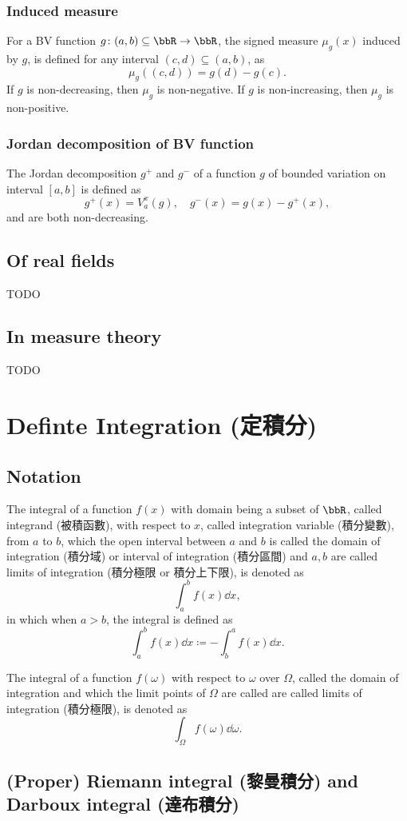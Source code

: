\documentclass[a4paper,12pt]{report}
\begin{document}
\begin{itemize}
\begin{itemize}
\subsubsection{Induced measure}
For a BV function $g\colon(a,b)\subseteq\bbR\to\bbR$, the signed measure $\mu_g(x)$ induced by $g$, is defined for any interval $(c,d)\subseteq (a,b)$, as
\[\mu_g((c,d))=g(d)-g(c).\]
If $g$ is non-decreasing, then $\mu_g$ is non-negative. If $g$ is non-increasing, then $\mu_g$ is non-positive.
\subsubsection{Jordan decomposition of BV function}
The Jordan decomposition $g^+$ and $g^-$ of a function $g$ of bounded variation on interval $[a,b]$ is defined as
\[g^+(x)=V_a^x(g),\quad g^-(x)=g(x)-g^+(x),\]
and are both non-decreasing.
\subsection{Of real fields}
TODO
\subsection{In measure theory}
TODO



\section{Definte Integration (定積分)}
\subsection{Notation}
The integral of a function $f(x)$ with domain being a subset of $\bbR$, called integrand (被積函數), with respect to $x$, called integration variable (積分變數), from $a$ to $b$, which the open interval between $a$ and $b$ is called the domain of integration (積分域) or interval of integration (積分區間) and $a,b$ are called limits of integration (積分極限 or 積分上下限), is denoted as
\[\int_a^bf(x)\dd{x},\]
in which when $a>b$, the integral is defined as
\[\int_a^bf(x)\dd{x}\coloneq-\int_b^af(x)\dd{x}.\]

The integral of a function $f(\omega)$ with respect to $\omega$ over $\Omega$, called the domain of integration and which the limit points of $\Omega$ are called are called limits of integration (積分極限), is denoted as
\[\int_{\Omega}f(\omega)\dd{\omega}.\]
\subsection{(Proper) Riemann integral (黎曼積分) and Darboux integral (達布積分)}

\end{itemize}
\end{itemize}
\end{document}
